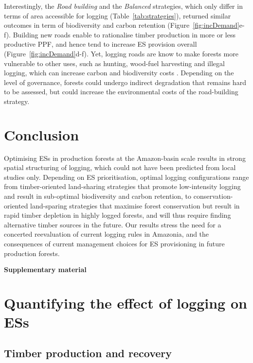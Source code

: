 \documentclass{article}
\newcommand{\beginsupplement}{%
        \setcounter{table}{0}
        \renewcommand{\thetable}{S\arabic{table}}%
        \setcounter{figure}{0}
        \renewcommand{\thefigure}{S\arabic{figure}}%
     }
\begin{document}
Interestingly, the \textit{Road building} and the \textit{Balanced} strategies, which only differ in terms of area accessible for logging (Table~\ref{tab:strategies}), returned similar outcomes in term of biodiversity and carbon retention (Figure~\ref{fig:incDemand}e-f).
Building new roads enable to rationalise timber production in more or less productive PPF, and hence tend to increase ES provision overall (Figure~\ref{fig:incDemand}d-f). 
Yet, logging roads are know to make forests more vulnerable to other uses, such as hunting, wood-fuel harvesting and illegal logging, which can increase carbon and biodiversity costs \cite{Laurance2009a}. Depending on the level of governance, forests could undergo indirect degradation that remains hard to be assessed, but could increase the environmental costs of the road-building strategy. 

\section{Conclusion}

Optimising ESs in production forests at the Amazon-basin scale results in strong spatial structuring of logging, which could not have been predicted from local studies only. Depending on ES prioritisation, optimal logging configurations range from timber-oriented land-sharing strategies that promote low-intensity logging and result in sub-optimal biodiversity and carbon retention, to conservation-oriented land-sparing strategies that maximise forest conservation but result in rapid timber depletion in highly logged forests, and will thus require finding alternative timber sources in the future. Our results stress the need for a concerted reevaluation of current logging rules in Amazonia, and the consequences of current management choices for ES provisioning in future production forests. 

\clearpage





\onecolumn
\beginsupplement
\appendix
\begin{center}
    { \huge \textbf{Supplementary material}}
\end{center} 

\section{Quantifying the effect of logging on ESs}
\label{sec:ESestimation}

\subsection{Timber production and recovery}
\end{document}
